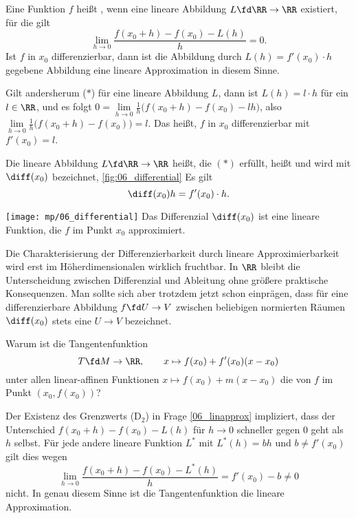 \begin{antwort}
Eine Funktion $f$ heißt , wenn eine 
lineare Abbildung $L\fd \RR \to \RR$ existiert, für die gilt
\begin{equation}
\lim_{h\to 0} \frac{f(x_0+h)-f(x_0)-L(h)}{h} = 0.
\tag{D2}
\end{equation}
Ist $f$ in $x_0$ differenzierbar, 
dann ist die Abbildung durch $L(h) = f'(x_0)\cdot h$ gegebene 
Abbildung eine lineare Approximation in diesem Sinne.

Gilt andersherum ($\ast$) für eine lineare Abbildung $L$, 
dann ist $L(h)=l\cdot h$ für ein $l\in\RR$,  und es folgt
$0 = \lim\limits_{h\to 0} \frac{1}{h}
\big(f(x_0+h)-f(x_0)-lh\big)$, also 
$\lim\limits_{h\to 0} \frac{1}{h} \big(f(x_0+h)-f(x_0)\big)=l.$
Das heißt, $f$ in $x_0$ differenzierbar mit $f'(x_0)=l$.

Die lineare Abbildung $L\fd \RR\to\RR$ heißt, die $(\ast)$
erfüllt, heißt  und wird mit 
$\diff (x_0)$ bezeichnet, \sieheAbbildung\ref{fig:06_differential} Es gilt 
\[
\diff (x_0) h = f'(x_0)\cdot h.
\]
\begin{center}
  \texttt{[image: mp/06\_differential]}
  {%
    Das Differenzial $\diff (x_0)$ ist eine lineare Funktion, die $f$ 
    im Punkt $x_0$ approximiert.
  }
  \label{fig:06_differential}
\end{center}

Die Charakterisierung der Differenzierbarkeit durch lineare 
Approximierbarkeit wird erst im Höherdimensionalen wirklich fruchtbar. 
In $\RR$ bleibt die Unterscheidung zwischen Differenzial und Ableitung 
ohne größere praktische Konsequenzen. Man sollte sich aber trotzdem 
jetzt schon einprägen, dass für eine differenzierbare Abbildung 
$f\fd U \to V$ zwischen beliebigen normierten Räumen $\diff (x_0)$ 
stets eine  $U\to V$ bezeichnet. \AntEnd
\end{antwort}


\begin{frage}\label{06_tang}
Warum ist die Tangentenfunktion
\[
T\fd M\to\RR, \qquad x\mapsto f(x_0)+f'(x_0)(x-x_0)
\]
unter allen linear-affinen Funktionen 
$x\mapsto f(x_0)+ m (x-x_0)$ die  
von $f$ im Punkt $(x_0,f(x_0))$?
\end{frage}

\begin{antwort}
Der Existenz des Grenzwerts (D$_2$) in Frage \ref{06_linapprox} 
impliziert, dass der Unterschied $f(x_0+h)-f(x_0)-L(h)$ 
für $h\to 0$ schneller gegen $0$ geht als $h$ selbst. 
Für jede andere lineare Funktion $L^*$ mit $L^*(h)=bh$ und 
$b\not= f'(x_0)$ gilt dies wegen 
\[
\lim_{h\to 0} \frac{f(x_0+h)-f(x_0)-L^*(h)}{h} = f'(x_0)-b \not=0
\]
nicht. In genau diesem Sinne ist die Tangentenfunktion die 
 lineare Approximation. 
\AntEnd
\end{antwort}

